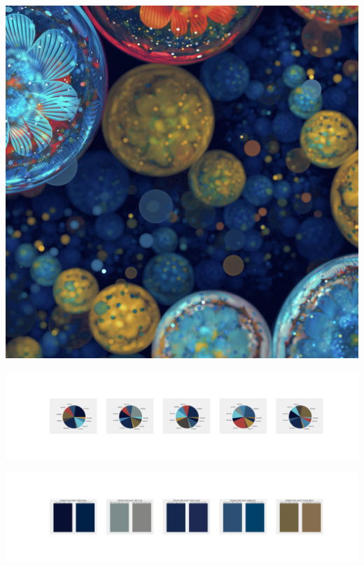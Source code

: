 \documentclass[11pt]{article}
\begin{document}
\begin{landscape}
    \begin{center}
    \includegraphics[width=\textwidth]{./nbimg/file (368).jpg}
    \end{center}

    \begin{center}
    \includegraphics[width=250mm]{./nbimg/pie-298.jpg}
    \end{center}

    \begin{center}
    \includegraphics[width=250mm]{./nbimg/peak-298.jpg}
    \end{center}
    


\end{landscape}
\end{document}
